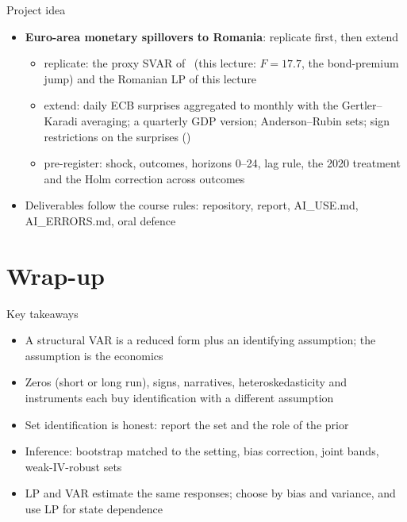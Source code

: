 \begin{frame}{Project idea}
\itemsize{\small}
\begin{itemize}
    \item \textbf{Euro-area monetary spillovers to Romania}: replicate first, then extend
    \begin{itemize}
        \item replicate: the proxy SVAR of \ (this lecture: $F = 17.7$, the bond-premium jump) and the Romanian LP of this lecture
        \item extend: daily ECB surprises aggregated to monthly with the Gertler--Karadi averaging; a quarterly GDP version; Anderson--Rubin sets; sign restrictions on the surprises ()
        \item pre-register: shock, outcomes, horizons 0--24, lag rule, the 2020 treatment and the Holm correction across outcomes
    \end{itemize}
    \item Deliverables follow the course rules: repository, report, AI\_USE.md, AI\_ERRORS.md, oral defence
\end{itemize}
\end{frame}


\section{Wrap-up}

\begin{frame}{Key takeaways}
\itemsize{\small}
\begin{itemize}
    \item A structural VAR is a reduced form plus an identifying assumption; the assumption is the economics
    \item Zeros (short or long run), signs, narratives, heteroskedasticity and instruments each buy identification with a different assumption
    \item Set identification is honest: report the set and the role of the prior
    \item Inference: bootstrap matched to the setting, bias correction, joint bands, weak-IV-robust sets
    \item LP and VAR estimate the same responses; choose by bias and variance, and use LP for state dependence
\end{itemize}
\end{frame}

